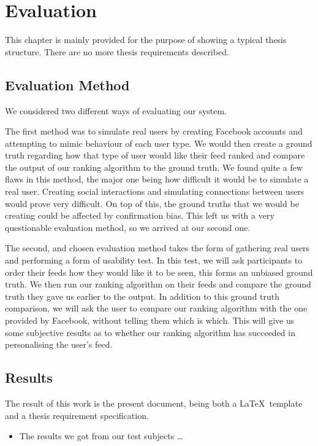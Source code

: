 \chapter{Evaluation}\label{ch:eval}

This chapter is mainly provided for the purpose of showing a typical thesis
structure.  There are no more thesis requirements described.

\section {Evaluation Method}

We considered two different ways of evaluating our system.

The first method was to simulate real users by creating Facebook accounts and attempting to mimic behaviour of each user type. We would then create a ground truth regarding how that type of user would like their feed ranked and compare the output of our ranking algorithm to the ground truth. We found quite a few flaws in this method, the major one being how difficult it would be to simulate a real user. Creating social interactions and simulating connections between users would prove very difficult. On top of this, the ground truths that we would be creating could be affected by confirmation bias. This left us with a very questionable evaluation method, so we arrived at our second one.

The second, and chosen evaluation method takes the form of gathering real users and performing a form of usability test. In this test, we will ask participants to order their feeds how they would like it to be seen, this forms an unbiased ground truth. We then run our ranking algorithm on their feeds and compare the ground truth they gave us earlier to the output. In addition to this ground truth comparison, we will ask the user to compare our ranking algorithm with the one provided by Facebook, without telling them which is which. This will give us some subjective results as to whether our ranking algorithm has succeeded in personalising the user's feed.

\section{Results}

The result of this work is the present document, being both a \LaTeX\
template and a thesis requirement specification.

\begin{itemize}
  \item The results we got from our test subjects
\ldots
\end{itemize}

